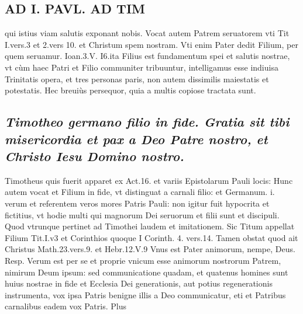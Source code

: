 \documentclass{article}
\begin{document}
\begin{pages}
\section*{AD I. PAVL. AD TIM }
\marginpar{[ p.4 ]}\pstart qui istius viam salutis exponant nobis. Vocat autem Patrem seruatorem vti Tit I.vers.3 et 2.vers 10. et Christum spem nostram. Vti enim Pater dedit Filium, per quem seruamur. Ioan.3.V. I6.ita Filius est fundamentum spei et salutis nostrae, vt cùm haec Patri et Filio communiter tribuuntur, intelligamus esse indiuisa Trinitatis opera, et tres personas paris, non autem dissimilis maiestatis et potestatis. Hec breuiùs persequor, quia a multis copiose tractata sunt.  \pend
{}
{}
\subsection*{\textit{ Timotheo germano filio in fide. Gratia sit tibi misericordia et pax a Deo Patre nostro, et Christo Iesu Domino nostro. }}\pstart Timotheus quis fuerit apparet ex Act.16. et variis Epistolarum Pauli locis: Hunc autem vocat et Filium in fide, vt distinguat a carnali filio: et Germanum. i. verum et referentem veros mores Patris Pauli: non igitur fuit hypocrita et fictitius, vt hodie multi qui magnorum Dei seruorum et filii sunt et discipuli. Quod vtrunque pertinet ad Timothei laudem et imitationem.  \pend\pstart Sic Titum appellat Filium Tit.I.v3 et Corinthios quoque I Corinth. 4. vers.14. Tamen obstat quod ait Christus Math.23.vers.9. et Hebr.12.V.9 Vnus est Pater animorum, nempe, Deus. Resp. Verum est per se et proprie vnicum esse animorum nostrorum Patrem, nimirum Deum ipsum: sed communicatione quadam, et quatenus homines sunt huius nostrae in fide et Ecclesia Dei generationis, aut potius regenerationis instrumenta, vox ipsa Patris benigne illis a Deo communicatur, eti et Patribus carnalibus eadem vox Patris. Plus  \pend

\end{pages}
\end{document}
